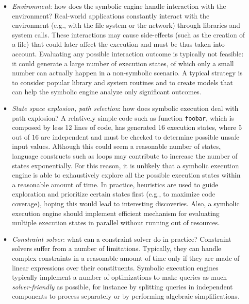 \begin{itemize}
  \item {\em Environment}: how does the symbolic engine handle interaction with the environment?
  Real-world applications constantly interact with the environment (e.g., with the file system or the network) through libraries and system calls. These interactions may cause side-effects
(such as the creation of a file) that could later affect the execution and must be thus taken into account. Evaluating any possible interaction outcome is typically not feasible: it could generate a large number of execution states, of which only a small number can actually happen in a non-symbolic scenario. A typical strategy is to consider popular library and system routines and to create models that can help the symbolic engine analyze only significant outcomes.
\vspace{1mm}

  \item {\em State space explosion, path selection}: how does symbolic execution deal with path explosion?
  A relatively simple code such as function {\tt foobar}, which is composed by less 12 lines of code, has generated 16 execution states, where $5$ out of $16$ are independent and must be checked to determine possible unsafe input values. Although this could seem a reasonable number of states, language constructs such as loops may contribute to increase the number of states exponentially. For this reason, it is unlikely that a symbolic execution engine is able to exhaustively explore all the possible execution states within a reasonable amount of time. In practice, heuristics are used to guide exploration and prioritize certain states first (e.g., to maximize code coverage), hoping this would lead to interesting discoveries. Also, a symbolic execution engine should implement efficient mechanism for evaluating multiple execution states in parallel without running out of resources.
\vspace{1mm}

  \item {\em Constraint solver}: what can a constraint solver do in practice?
 Constraint solvers suffer from a number of limitations. Typically, they can handle complex constraints in a reasonable amount of time only if they are made of linear expressions over their constituents. Symbolic execution engines typically implement a number of optimizations to make queries as much {\em solver-friendly} as possible, for instance by splitting queries in independent components to process separately or by performing algebraic simplifications.
\vspace{1mm}


\end{itemize}
